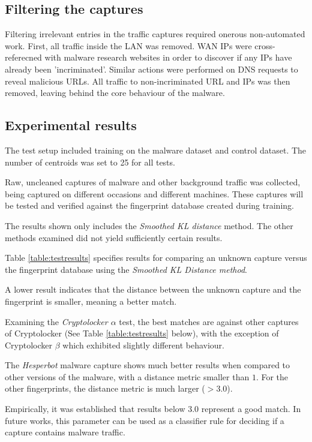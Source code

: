\documentclass[9pt,journal,compsoc]{IEEEtran}
\begin{document}
\subsection{Filtering the captures}
Filtering irrelevant entries in the traffic captures required onerous non-automated work.
First, all traffic inside the LAN was removed. WAN IPs were cross-referecned with malware research websites in order to discover if any IPs have already been 'incriminated'.
Similar actions were performed on DNS requests to reveal malicious URLs.
All traffic to non-incriminated URL and IPs was then removed, leaving behind the core behaviour of the malware.

\subsection{Experimental results}
The test setup included training on the malware dataset and control dataset.
The number of centroids was set to 25 for all tests.

Raw, uncleaned captures of malware and other background traffic was collected, being captured on different occasions and different machines. These captures will be tested and verified against the fingerprint database created during training.

The results shown only includes the {\em Smoothed KL distance} method. The other methods examined did not yield sufficiently certain results.

Table \ref{table:testresults} specifies results for comparing an unknown capture versus the fingerprint database using the {\em Smoothed KL Distance method}.

A lower result indicates that the distance between the unknown capture and the fingerprint is smaller, meaning a better match.

Examining the \emph{Cryptolocker $\alpha$} test, the best matches are against other captures of Cryptolocker (See Table \ref{table:testresults} below), with the exception of Cryptolocker $\beta$ which exhibited slightly different behaviour.

The \emph{Hesperbot} malware capture shows much better results when compared to other versions of the malware, with a distance metric smaller than $1$.
For the other fingerprints, the distance metric is much larger ($>3.0$).

Empirically, it was established that results below $3.0$ represent a good match. In future works, this parameter can be used as a classifier rule for deciding if a capture contains malware traffic.
\end{document}
